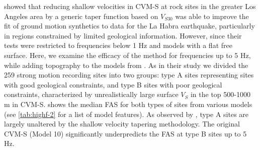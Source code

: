 
\citet{huCalibrationNearsurfaceSeismic2021} showed that reducing shallow velocities in CVM-S at rock sites in the greater Los Angeles area by a generic taper function based on $V_{S30}$ was able to improve the fit of ground motion synthetics to data for the La Habra earthquake, particularly in regions constrained by limited geological information.
However, since their tests were restricted to frequencies below 1 Hz and models with a flat free surface. Here, we examine the efficacy of the method for frequencies up to 5 Hz, while adding topography to the models from \citet{huCalibrationNearsurfaceSeismic2021}.
As in their study we divided the 259 strong motion recording sites into two groups: type A sites representing sites with good geological constraints, and type B sites with poor geological constraints, characterized by unrealistically large surface $V_S$ in the top 500-1000 m in CVM-S.  shows the median FAS for both types of sites from various models (see \cref{tab:highf-2} for a list of model features). As observed by \citet{huCalibrationNearsurfaceSeismic2021}, type A sites are largely unaltered by the shallow velocity tapering methodology. The original CVM-S (Model 10) significantly underpredicts the FAS at type B sites up to 5 Hz. 

